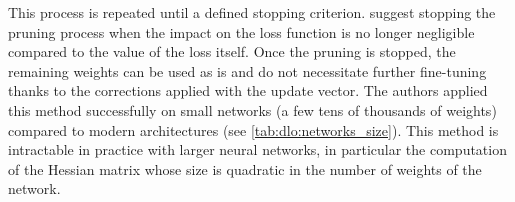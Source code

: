 






This process is repeated until a defined stopping criterion.
\citeauthor{DBLP:conf/nips/HassibiS92} suggest stopping the pruning process when
the impact on the loss function is no longer negligible compared to the value of
the loss itself. Once the pruning is stopped, the remaining weights can be used
as is and do not necessitate further fine-tuning thanks to the corrections
applied with the update vector. The authors applied this method successfully on
small networks (a few tens of thousands of weights) compared to modern
architectures (see \cref{tab:dlo:networks_size}). This method is intractable in
practice with larger neural networks, in particular the computation of the
Hessian matrix whose size is quadratic in the number of weights of the
network.\\

